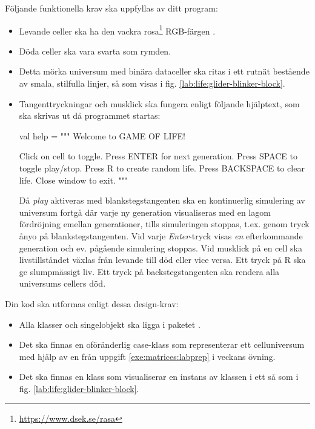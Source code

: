 Följande funktionella krav ska uppfyllas av ditt program:
\begin{itemize}[nosep, label={$\square$},]
\item Levande celler ska ha den vackra rosa\footnote{\url{https://www.dsek.se/rasa}} RGB-färgen .
\item Döda celler ska vara svarta som rymden.
\item Detta mörka universum med binära dataceller ska ritas i ett rutnät bestående av smala, stilfulla linjer, så som visas i fig. \ref{lab:life:glider-blinker-block}.
\item Tangenttryckningar och musklick ska fungera enligt följande hjälptext, som ska skrivas ut då programmet startas:
\begin{CodeSmall}
  val help = """
    Welcome to GAME OF LIFE!

    Click on cell to toggle.
    Press ENTER for next generation.
    Press SPACE to toggle play/stop.
    Press R to create random life.
    Press BACKSPACE to clear life.
    Close window to exit.
  """
\end{CodeSmall}
Då \emph{play} aktiveras med blankstegstangenten ska en kontinuerlig simulering av universum fortgå där varje ny generation visualiseras med en lagom fördröjning emellan generationer, tills simuleringen stoppas, t.ex. genom tryck ånyo på blankstegstangenten. Vid varje \emph{Enter}-tryck visas \emph{en} efterkommande generation och ev. pågående simulering stoppas. Vid musklick på en cell ska livstillståndet växlas från levande till död eller vice versa. Ett tryck på R ska ge slumpmässigt liv. Ett tryck på backstegstangenten ska rendera alla universums cellers död.

\end{itemize}

\vspace{1em}\noindent Din kod ska utformas enligt dessa design-krav:
\begin{itemize}[nosep, label={$\square$}]
\item Alla klasser och singelobjekt ska ligga i paketet .
\item Det ska finnas en oföränderlig case-klass  som representerar ett celluniversum med hjälp av en  från uppgift \ref{exe:matrices:labprep} i veckans övning.
\item Det ska finnas en klass  som visualiserar en  instans av klassen  i ett   så som i fig. \ref{lab:life:glider-blinker-block}.
\end{itemize}


